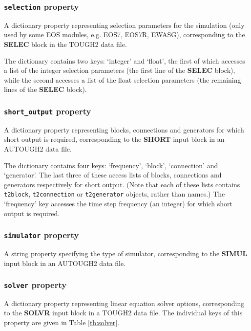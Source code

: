 \subsubsection{\texttt{selection} property}

A dictionary property representing selection parameters for the simulation (only used by some EOS modules, e.g. EOS7, EOS7R, EWASG), corresponding to the \textbf{SELEC} block in the TOUGH2 data file.

The dictionary contains two keys: `integer' and `float', the first of which accesses a list of the integer selection parameters (the first line of the \textbf{SELEC} block), while the second accesses a list of the float selection parameters (the remaining lines of the \textbf{SELEC} block).

\subsubsection{\texttt{short\_output} property}

A dictionary property representing blocks, connections and generators for which short output is required, corresponding to the \textbf{SHORT} input block in an AUTOUGH2 data file.

The dictionary contains four keys: `frequency', `block', `connection' and `generator'. The last three of these access lists of blocks, connections and generators respectively for short output.  (Note that each of these lists contains \texttt{t2block}, \texttt{t2connection} or \texttt{t2generator} objects, rather than names.)  The `frequency' key accesses the time step frequency (an integer) for which short output is required.

\subsubsection{\texttt{simulator} property}

A string property specifying the type of simulator, corresponding to the \textbf{SIMUL} input block in an AUTOUGH2 data file.

\subsubsection{\texttt{solver} property}

A dictionary property representing linear equation solver options, corresponding to the \textbf{SOLVR} input block in a TOUGH2 data file.  The individual keys of this property are given in Table \ref{tb:solver}.

